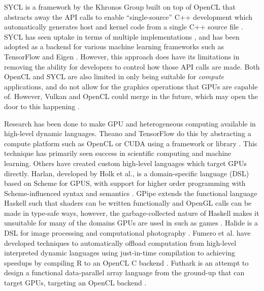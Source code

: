 \documentclass[a4paper,12pt,twoside,openright]{report}
\begin{document}
SYCL is a framework by the Khronos Group built on top of OpenCL that abstracts
away the API calls to enable ``single-source'' C++ development which
automatically generates host and kernel code from a single C++ source file
\cite{OpenCL22Release} \cite{SYCL}. SYCL has seen uptake in terms of multiple
implementations \cite{ComputeCPP} \cite{triSYCL}, and has been adopted as a
backend for various machine learning frameworks such as TensorFlow and Eigen
\cite{SYCLTensorFlow} \cite{SYCLEigen}. However, this approach does have its
limitations in removing the ability for developers to control how those API
calls are made. Both OpenCL and SYCL are also limited in only being suitable
for \textit{compute} applications, and do not allow for the graphics operations
that GPUs are capable of. However, Vulkan and OpenCL could merge in the future,
which may open the door to this happening \cite{VulkanOpenCLMerge}.

Research has been done to make GPU and heterogeneous computing available in
high-level dynamic languages. Theano and TensorFlow do this by abstracting a
compute platform such as OpenCL or CUDA using a framework or library
\cite{Theano2016} \cite{TensorFlowWhitePaper}. This technique has primarily
seen success in scientific computing and machine learning. Others have created
custom high-level languages which target GPUs directly. Harlan, developed by
Holk et al., is a domain-specific language (DSL) based on Scheme for GPUS, with
support for higher order programming with Scheme-influenced syntax and
semantics \cite{Harlan} \cite{HarlanAnnouncement}. GPipe extends the functional
language Haskell such that shaders can be written functionally and OpenGL calls
can be made in type-safe ways, however, the garbage-collected nature of Haskell
makes it unsuitable for many of the domains GPUs are used in such as games
\cite{HaskellState} \cite{GPipe}. Halide is a DSL for image processing and
computational photography \cite{Halide}. Fumero et al. have developed
techniques to automatically offload computation from high-level interpreted
dynamic languages using just-in-time compilation to achieving speedups by
compiling R to an OpenCL C backend \cite{JITGPU}. Futhark is an attempt to
design a functional data-parallel array language from the ground-up that can
target GPUs, targeting an OpenCL backend \cite{Futhark}.
\end{document}
